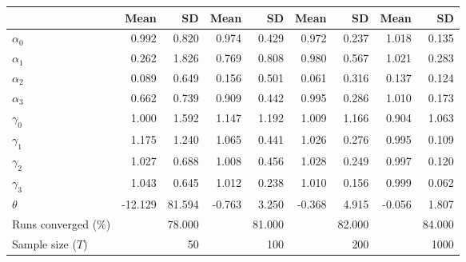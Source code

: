 
\begin{tabular}[t]{lrrrrrrrr}
\toprule
  & Mean & SD & Mean  & SD  & Mean   & SD   & Mean    & SD   \\
\midrule
$\alpha_{0}$ & 0.992 & 0.820 & 0.974 & 0.429 & 0.972 & 0.237 & 1.018 & 0.135\\
$\alpha_{1}$ & 0.262 & 1.826 & 0.769 & 0.808 & 0.980 & 0.567 & 1.021 & 0.283\\
$\alpha_{2}$ & 0.089 & 0.649 & 0.156 & 0.501 & 0.061 & 0.316 & 0.137 & 0.124\\
$\alpha_{3}$ & 0.662 & 0.739 & 0.909 & 0.442 & 0.995 & 0.286 & 1.010 & 0.173\\
$\gamma_{0}$ & 1.000 & 1.592 & 1.147 & 1.192 & 1.009 & 1.166 & 0.904 & 1.063\\
$\gamma_{1}$ & 1.175 & 1.240 & 1.065 & 0.441 & 1.026 & 0.276 & 0.995 & 0.109\\
$\gamma_{2}$ & 1.027 & 0.688 & 1.008 & 0.456 & 1.028 & 0.249 & 0.997 & 0.120\\
$\gamma_{3}$ & 1.043 & 0.645 & 1.012 & 0.238 & 1.010 & 0.156 & 0.999 & 0.062\\
$\theta$ & -12.129 & 81.594 & -0.763 & 3.250 & -0.368 & 4.915 & -0.056 & 1.807\\
Runs converged (\%) &  & 78.000 &  & 81.000 &  & 82.000 &  & 84.000\\
Sample size ($T$) &  & 50 &  & 100 &  & 200 &  & 1000\\
\bottomrule
\end{tabular}
